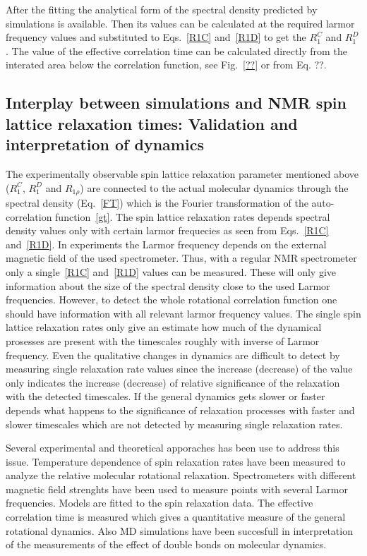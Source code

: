 \documentclass[aps,prl,superscriptaddress,twocolumn]{revtex4}
\begin{document}
After the fitting the analytical form of the spectral density predicted by simulations is available.
Then its values can be calculated at the required larmor frequency values and substituted to Eqs.~\ref{R1C}
and~\ref{R1D} to get the $R_{1}^{C}$ and $R_{1}^{D}$. The value of the effective correlation time can be
calculated directly from the interated area below the correlation function, see Fig.~\ref{??} or from 
Eq. ??.




\subsection{Interplay between simulations and NMR spin lattice relaxation times: Validation and interpretation of dynamics}

The experimentally observable spin lattice relaxation parameter mentioned above ($R_1^{C}$, $R_1^{D}$ and $R_{1\rho}$)
are connected to the actual molecular dynamics through the spectral density (Eq.~\ref{FT}) which is the Fourier transformation
of the auto-correlation function~\ref{gt}. The spin lattice relaxation rates depends spectral density values only 
with certain larmor frequecies as seen from Eqs.~\ref{R1C} and~\ref{R1D}. In experiments the Larmor frequency 
depends on the external magnetic field of the used spectrometer. Thus, with a regular NMR spectrometer only
a single~\ref{R1C} and~\ref{R1D} values can be measured. These will only give information about the size
of the spectral density close to the used Larmor frequencies. However, to detect the whole rotational
correlation function one should have information with all relevant larmor frequency values. 
The single spin lattice relaxation rates only give an estimate how much of the dynamical prosesses
are present with the timescales roughly with inverse of Larmor frequency. Even the qualitative
changes in dynamics are difficult to detect by measuring single relaxation rate values since the
increase (decrease) of the value only indicates the increase (decrease) of relative significance 
of the relaxation with the detected timescales. If the general dynamics gets slower or faster depends
what happens to the significance of relaxation processes with faster and slower timescales which 
are not detected by measuring single relaxation rates.

Several experimental and theoretical apporaches has been use to address this issue.
Temperature dependence of spin relaxation rates have been measured to analyze the relative 
molecular rotational relaxation. 
Spectrometers with different magnetic field strenghts have been used to measure points with 
several Larmor frequencies.
Models are fitted to the spin relaxation data.
The effective correlation time is measured which gives a quantitative measure of the general 
rotational dynamics. Also MD simulations have been succesfull in interpretation of the 
measurements of the effect of double bonds on molecular dynamics. 
\end{document}
